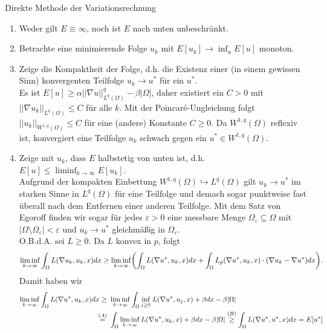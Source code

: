 	\glqq Direkte Methode der Variationsrechnung\grqq \begin{enumerate}[1.]
		\item Weder gilt $E \equiv \infty$, noch ist $E$ nach unten unbeschränkt.
		\item Betrachte eine minimierende Folge $u_k$ mit $E[u_k] \rightarrow \inf_u E[u]$ monoton.
		\item Zeige die Kompaktheit der Folge, d.h. die Existenz einer (in einem gewissen Sinn) konvergenten Teilfolge $u_k \rightarrow u^*$ für ein $u^*$. \\
		Es ist $E[u] \geq \alpha ||\nabla u||_{L^q(\Omega)}^q - \beta |\Omega|$, daher existiert ein $C > 0$ mit $||\nabla u_k||_{L^q(\Omega)} \leq C$ für alle $k$. Mit der Poincaré-Ungleichung folgt $||u_k||_{W^{1,q}(\Omega)} \leq C$ für eine (andere) Konstante $C \geq 0$. Da $W^{1,q}(\Omega)$ reflexiv ist, konvergiert eine Teilfolge $u_k$ schwach gegen ein $u^* \in W^{1,q}(\Omega)$.
		\item Zeige mit $u_k$, dass $E$ halbstetig von unten ist, d.h. $E[u] \leq \liminf_{k \rightarrow \infty} E[u_k]$. \\
		Aufgrund der kompakten Einbettung $W^{1,q}(\Omega) \hookrightarrow L^q(\Omega)$ gilt $u_k \rightarrow u^*$ im starken Sinne in $L^q(\Omega)$ für eine Teilfolge und demach sogar punktweise fast überall nach dem Entfernen einer anderen Teilfolge. Mit dem Satz von Egoroff finden wir sogar für jedes $\varepsilon > 0$ eine messbare Menge $\Omega_\varepsilon \subseteq \Omega$ mit $|\Omega \setminus \Omega_\varepsilon| < \varepsilon$ und $u_k \rightarrow u^*$ gleichmäßig in $\Omega_\varepsilon$. \\
		O.B.d.A. sei $L \geq 0$. Da $L$ konvex in $p$, folgt
		\[ \liminf_{k \rightarrow \infty} \int_{\Omega} L(\nabla u_k,u_k,x) dx \geq \liminf_{k \rightarrow \infty} \enbrace*{ \int_{\Omega} L(\nabla u^*,u_k,x) dx + \int_{\Omega} L_p(\nabla u^*,u_k,x) \cdot (\nabla u_k - \nabla u^*) dx }. \]
		Damit haben wir
		\begin{equation}
		\begin{aligned}
			\liminf_{k \rightarrow \infty} \int_{\Omega} L(\nabla u^*,u_k,x) dx \geq \ &\liminf_{k \rightarrow \infty} \int_{\Omega} \inf_{j \geq k} L(\nabla u^*,u_j,x) + \beta dx - \beta |\Omega| \\ \notag
			\overset{(A)}{=} \ &\int_{\Omega} \liminf_{k \rightarrow \infty} L(\nabla u^*,u_k,x)+ \beta dx - \beta |\Omega| \overset{(B)}{\geq} \int_{\Omega} L(\nabla u^*,u^*,x)dx = E[u^*]
		\end{aligned}

\end{equation}
\end{enumerate}
